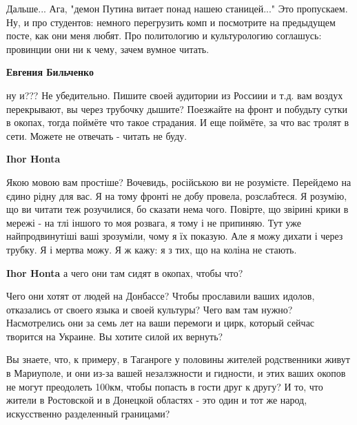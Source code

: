 \begin{itemize}
\begin{itemize}
Дальше... Ага, "демон Путина витает понад нашею станицей..." Это пропускаем.
Ну, и про студентов: немного перегрузить комп и посмотрите на предыдущем посте,
как они меня любят. Про политологию и культурологию соглашусь: провинции они ни
к чему, зачем вумное читать.

 
\textbf{Евгения Бильченко} 

ну и??? Не убедительно. Пишите своей аудитории из Россиии и т.д. вам воздух
перекрывают, вы через трубочку дышите? Поезжайте на фронт и побудьту сутки в
окопах, тогда поймёте что такое страдания. И еще поймёте, за что вас тролят в
сети. Можете не отвечать - читать не буду.


 
\textbf{Ihor Honta} 

Якою мовою вам простіше? Вочевидь, російською ви не розумієте. Перейдемо на
єдино рідну для вас. Я на тому фронті не добу провела, розслабтеся. Я розумію,
що ви читати теж розучилися, бо сказати нема чого. Повірте, що звірині крики в
мережі - на тлі іншого то моя розвага, я тому і не припиняю. Тут уже
найпродвинутіші ваші зрозуміли, чому я їх показую. Але я можу дихати і через
трубку. Я і мертва можу. Я ж кажу: я з тих, що на коліна не стають.

 
\textbf{Ihor Honta} а чего они там сидят в окопах, чтобы что?

Чего они хотят от людей на Донбассе? Чтобы прославили ваших идолов, отказались
от своего языка и своей культуры? Чего вам там нужно? Насмотрелись они за семь
лет на ваши перемоги и цирк, который сейчас творится на Украине. Вы хотите
силой их вернуть?

Вы знаете, что, к примеру, в Таганроге у половины жителей родственники живут в
Мариуполе, и они из-за вашей незалэжности и гидности, и этих ваших окопов не
могут преодолеть 100км, чтобы попасть в гости друг к другу? И то, что жители в
Ростовской и в Донецкой областях - это один и тот же народ, искусственно
разделенный границами?


\end{itemize}
\end{itemize}
